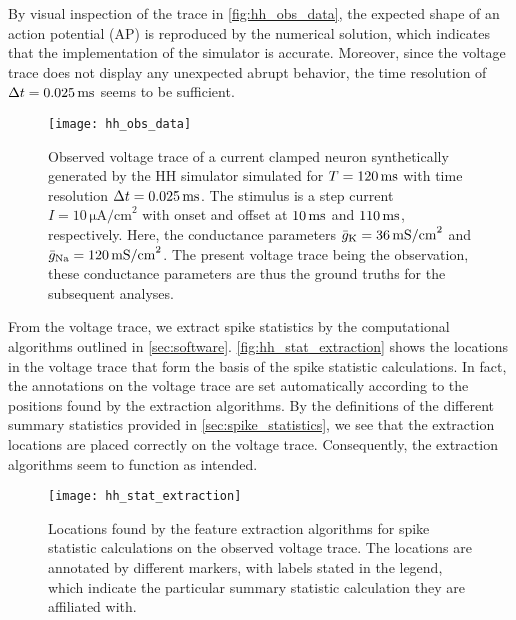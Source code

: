 By visual inspection of the trace in \autoref{fig:hh_obs_data}, the expected shape of an action potential (AP) is reproduced by the numerical solution, which indicates that the implementation of the simulator is accurate. Moreover, since the voltage trace does not display any unexpected abrupt behavior, the time resolution of $\Delta t=0.025 \,\mathrm{ms}$ seems to be sufficient. 

\begin{figure}[!htb]
    \centering
    \texttt{[image: hh\_obs\_data]}
    \caption{Observed voltage trace of a current clamped neuron synthetically generated by the HH simulator simulated for $T = 120 \,\mathrm{ms}$ with time resolution $\Delta t=0.025 \,\mathrm{ms}$. The stimulus is a step current $I = 10 \, \mathrm{\mu A/cm}^2$ with onset and offset at $10 \,\mathrm{ms}$ and $110 \,\mathrm{ms}$, respectively. Here, the conductance parameters $\bar{g}_{\mathrm{K}} = 36 \,\mathrm{mS/cm}^2$ and $\bar{g}_{\mathrm{Na}} = 120 \,\mathrm{mS/cm}^2$. The present voltage trace being the observation, these conductance parameters are thus the ground truths for the subsequent analyses.}
    \label{fig:hh_obs_data}
\end{figure} 

From the voltage trace, we extract spike statistics by the computational algorithms outlined in \cref{sec:software}. \autoref{fig:hh_stat_extraction} shows the locations in the voltage trace that form the basis of the spike statistic calculations. In fact, the annotations on the voltage trace are set automatically according to the positions found by the extraction algorithms. By the definitions of the different summary statistics provided in \cref{sec:spike_statistics}, we see that the extraction locations are placed correctly on the voltage trace. Consequently, the extraction algorithms seem to function as intended. 

\begin{figure}[!htb]
    \centering
    \texttt{[image: hh\_stat\_extraction]}
    \caption{Locations found by the feature extraction algorithms for spike statistic calculations on the observed voltage trace. The locations are annotated by different markers, with labels stated in the legend, which indicate the particular summary statistic calculation they are affiliated with.}
    \label{fig:hh_stat_extraction}
\end{figure} 

